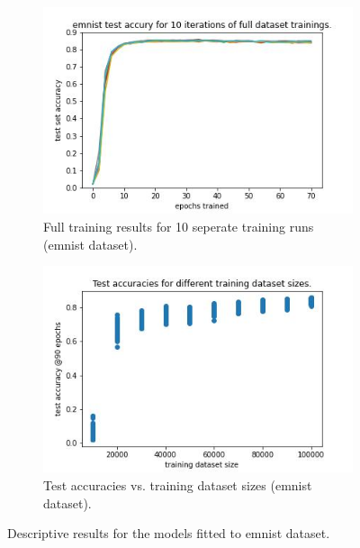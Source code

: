 \documentclass{article} %
\begin{document}
\begin{figure}
    \begin{subfigure}{.5\textwidth}
        \centering
        \includegraphics[width=.8\linewidth]{emnist/full_dataset_acc_vs_epoch.jpg}
        \caption{Full training results for 10 seperate training runs (emnist dataset).}
        \label{fig_full_dataset_epoch_vs_acc}
    \end{subfigure}%
    \begin{subfigure}{.5\textwidth}
        \centering
        \includegraphics[width=.8\linewidth]{emnist/training_datasetsize_vs_test_acc.jpg}
        \caption{Test accuracies vs. training dataset sizes (emnist dataset).}
        \label{fig_traing_subset_size_vs_test_acc}
    \end{subfigure}

    \caption{Descriptive results for the models fitted to emnist dataset.}
    \label{fig:desc_plots_emnist}
\end{figure}
\end{document}

